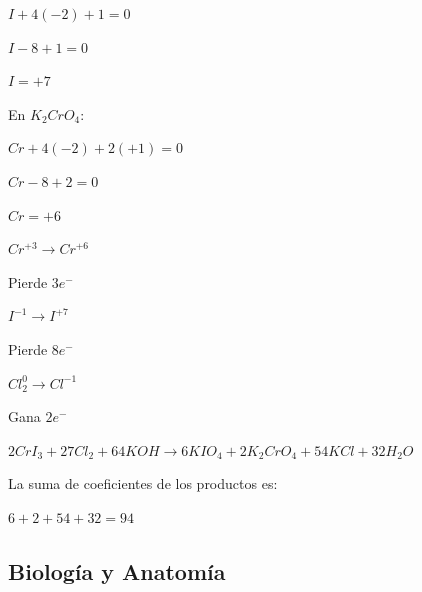 \begin{enumerate}[resume]
	$I+4(-2)+1=0$

	$I-8+1=0$

	$I=+7$

	En $K_2CrO_4$:

	$Cr+4(-2)+2(+1)=0$

	$Cr-8+2=0$

	$Cr=+6$


	$Cr^{+3}\rightarrow Cr^{+6}$

	Pierde $3e^-$

	$I^{-1}\rightarrow I^{+7}$

	Pierde $8e^-$

	$Cl_2^{0}\rightarrow Cl^{-1}$

	Gana $2e^-$


	$2CrI_3+27Cl_2+64KOH\rightarrow 6KIO_4+2K_2CrO_4+54KCl+32H_2O$

	La suma de coeficientes de los productos es:

	$6+2+54+32=94$


	\vspace{6mm}




\end{enumerate}



	\subsection*{Biología y Anatomía}

